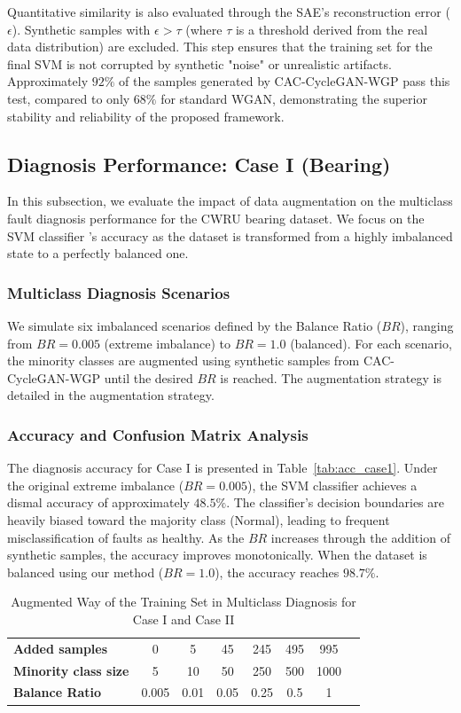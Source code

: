 Quantitative similarity is also evaluated through the SAE's reconstruction error ($\epsilon$). Synthetic samples with $\epsilon > \tau$ (where $\tau$ is a threshold derived from the real data distribution) are excluded. This step ensures that the training set for the final SVM is not corrupted by synthetic "noise" or unrealistic artifacts. Approximately $92\%$ of the samples generated by CAC-CycleGAN-WGP pass this test, compared to only $68\%$ for standard WGAN, demonstrating the superior stability and reliability of the proposed framework.

\subsection{Diagnosis Performance: Case I (Bearing)}
In this subsection, we evaluate the impact of data augmentation on the multiclass fault diagnosis performance for the CWRU bearing dataset. We focus on the SVM classifier \cite{widodo2007svm_machine}'s accuracy as the dataset is transformed from a highly imbalanced state to a perfectly balanced one.

\subsubsection{Multiclass Diagnosis Scenarios}
We simulate six imbalanced scenarios defined by the Balance Ratio ($BR$), ranging from $BR=0.005$ (extreme imbalance) to $BR=1.0$ (balanced). For each scenario, the minority classes are augmented using synthetic samples from CAC-CycleGAN-WGP until the desired $BR$ is reached. The augmentation strategy is detailed in the augmentation strategy.

\subsubsection{Accuracy and Confusion Matrix Analysis}
The diagnosis accuracy for Case I is presented in Table~\ref{tab:acc_case1}. Under the original extreme imbalance ($BR=0.005$), the SVM classifier achieves a dismal accuracy of approximately $48.5\%$. The classifier's decision boundaries are heavily biased toward the majority class (Normal), leading to frequent misclassification of faults as healthy. As the $BR$ increases through the addition of synthetic samples, the accuracy improves monotonically. When the dataset is balanced using our method ($BR=1.0$), the accuracy reaches $98.7\%$.

\begin{table}[htbp]
\centering
\caption{Augmented Way of the Training Set in Multiclass Diagnosis for Case I and Case II}
\label{tab:aug_strategy}
\begin{tabular}{lccccccc}
\hline
\textbf{Added samples} & 0 & 5 & 45 & 245 & 495 & 995 \\
\textbf{Minority class size} & 5 & 10 & 50 & 250 & 500 & 1000 \\
\textbf{Balance Ratio} & 0.005 & 0.01 & 0.05 & 0.25 & 0.5 & 1 \\
\hline
\end{tabular}
\end{table}

